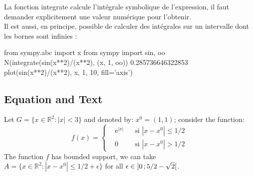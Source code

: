 La fonction integrate calcule l’intégrale symbolique de l’expression, il faut
demander explicitement une valeur numérique pour l’obtenir.
\\
Il est aussi, en principe, possible de calculer des intégrales sur un intervalle
dont les bornes sont infinies :
\begin{python}
from sympy.abc import x
from sympy import sin, oo
N(integrate(sin(x**2)/(x**2), (x, 1, oo))
0.285736646322853
plot(sin(x**2)/(x**2), x, 1, 10, fill='axis')
\end{python}

\subsection{Equation and Text}

\begin{example}
Let $G=\{x\in\mathbb{R}^2:|x|<3\}$ and denoted by: $x^0=(1,1)$; consider the function:
\begin{equation}
f(x)=\left\{\begin{aligned} & \mathrm{e}^{|x|} & & \text{si $|x-x^0|\leq 1/2$}\\
& 0 & & \text{si $|x-x^0|> 1/2$}\end{aligned}\right.
\end{equation}
The function $f$ has bounded support, we can take $A=\{x\in\mathbb{R}^2:|x-x^0|\leq 1/2+\epsilon\}$ for all $\epsilon\in\mathopen{]}0\,;5/2-\sqrt{2}\mathclose{[}$.
\end{example}

